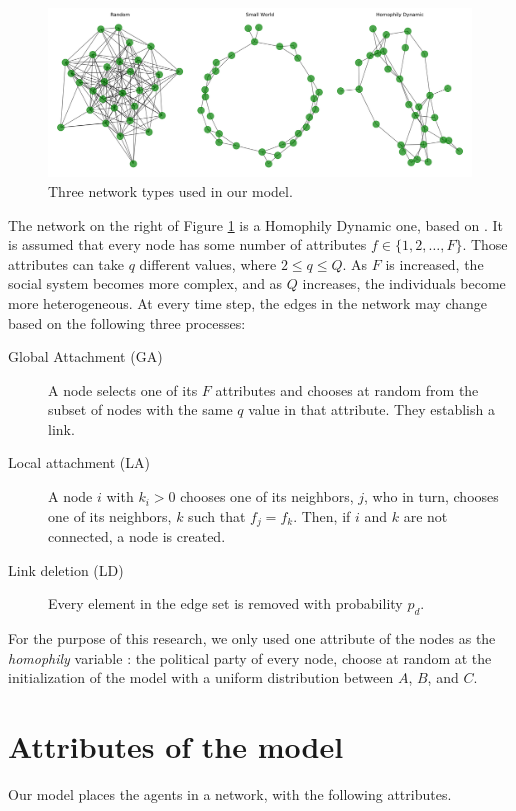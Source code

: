 \documentclass[letterpaper, 11pt]{article}
\begin{document}
\begin{figure}[!h]
\centering
\includegraphics[width=.9\linewidth]{img/f1.png}
\caption{\label{fig:orgbe3c0a7}
Three network types used in our model.}
\end{figure}


The network on the right of Figure \ref{fig:orgbe3c0a7} is a Homophily Dynamic one, based on \citet{murase2019}. It is assumed that every node has some number of attributes \(f \in \{1, 2, \ldots, F\}\). Those attributes can take \(q\) different values, where \(2 \leq q \leq Q\). As \(F\) is increased, the social system becomes more complex, and as \(Q\) increases, the individuals become more heterogeneous. At every time step, the edges in the network may change based on the following three processes:

\begin{description}
\item[{Global Attachment (GA)}] A node selects one of its \(F\) attributes and chooses at random from the subset of nodes with the same \(q\) value in that attribute. They establish a link.
\item[{Local attachment (LA)}] A node \(i\) with \(k_{i} > 0\) chooses one of its neighbors, \(j\), who in turn, chooses one of its neighbors, \(k\) such that \(f_{j} = f_{k}\). Then, if \(i\) and \(k\) are not connected, a node is created.
\item[{Link deletion (LD)}] Every element in the edge set is removed with probability \(p_{d}\).
\end{description}

For the purpose of this research, we only used one attribute of the nodes as the \emph{homophily} variable : the political party of every node, choose at random at the initialization of the model with a uniform distribution between \(A\), \(B\), and \(C\).

\section{Attributes of the model}
\label{sec:org477d8d5}
Our model places the agents in a network, with the following attributes.
\end{document}
